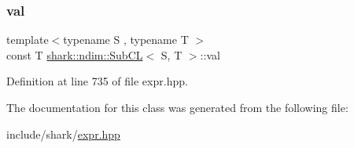 \subsubsection{\texorpdfstring{val}{val}}
{\footnotesize\ttfamily template$<$typename S , typename T $>$ \\
const T \hyperlink{classshark_1_1ndim_1_1_sub_c_l}{shark\+::ndim\+::\+Sub\+CL}$<$ S, T $>$\+::val\hspace{0.3cm}{\ttfamily [private]}}



Definition at line 735 of file expr.\+hpp.



The documentation for this class was generated from the following file\+:\begin{DoxyCompactItemize}
\item 
include/shark/\hyperlink{expr_8hpp}{expr.\+hpp}\end{DoxyCompactItemize}
